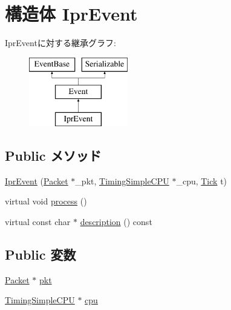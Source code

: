 \hypertarget{structTimingSimpleCPU_1_1IprEvent}{
\section{構造体 IprEvent}
\label{structTimingSimpleCPU_1_1IprEvent}
}
IprEventに対する継承グラフ:\begin{figure}[H]
\begin{center}
\leavevmode
\includegraphics[height=3cm]{structTimingSimpleCPU_1_1IprEvent}
\end{center}
\end{figure}
\subsection*{Public メソッド}
\begin{DoxyCompactItemize}
\item 
\hyperlink{structTimingSimpleCPU_1_1IprEvent_aec0e2beb27dc27f4f34d1b8cc050b44f}{IprEvent} (\hyperlink{classPacket}{Packet} $\ast$\_\-pkt, \hyperlink{classTimingSimpleCPU_1_1TimingSimpleCPU}{TimingSimpleCPU} $\ast$\_\-cpu, \hyperlink{base_2types_8hh_a5c8ed81b7d238c9083e1037ba6d61643}{Tick} t)
\item 
virtual void \hyperlink{structTimingSimpleCPU_1_1IprEvent_a2e9c5136d19b1a95fc427e0852deab5c}{process} ()
\item 
virtual const char $\ast$ \hyperlink{structTimingSimpleCPU_1_1IprEvent_a5a14fe478e2393ff51f02e9b7be27e00}{description} () const 
\end{DoxyCompactItemize}
\subsection*{Public 変数}
\begin{DoxyCompactItemize}
\item 
\hyperlink{classPacket}{Packet} $\ast$ \hyperlink{structTimingSimpleCPU_1_1IprEvent_a267e60cd6919d05db58405ccc69bd7b0}{pkt}
\item 
\hyperlink{classTimingSimpleCPU_1_1TimingSimpleCPU}{TimingSimpleCPU} $\ast$ \hyperlink{structTimingSimpleCPU_1_1IprEvent_ace3e131319475077fac2fa861708b0c9}{cpu}
\end{DoxyCompactItemize}



